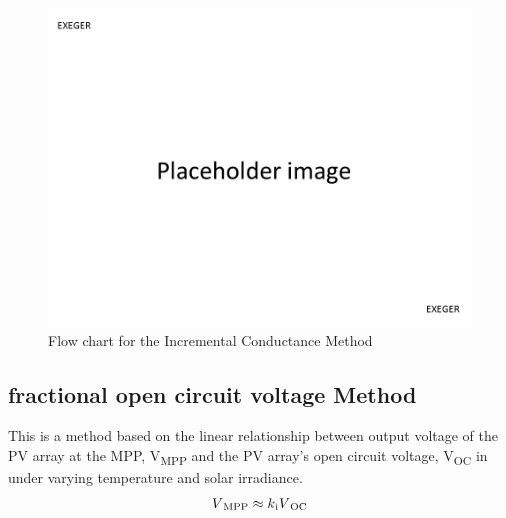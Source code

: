   \begin{figure}[H]
      \begin{center}
      \includegraphics[width=\textwidth]{images/pacehold}
      \caption{ Flow chart for the Incremental Conductance Method}
      \label{fig:inCflow}
      \end{center}
      \end{figure}
  \subsection{fractional open circuit voltage Method }
  This is a method based on the linear relationship between output voltage of the PV array at the \ac{MPP}, V\textsubscript{MPP} and the PV array's open circuit voltage, V\textsubscript{OC} in under varying temperature and solar irradiance. \\
  
  \begin{equation}
    \begin{aligned}
  V\textsubscript{MPP}\approx k\textsubscript{i}V\textsubscript{OC}
  \label{eq:equ_fracoc}
  \end{aligned}
  \end{equation}
  
